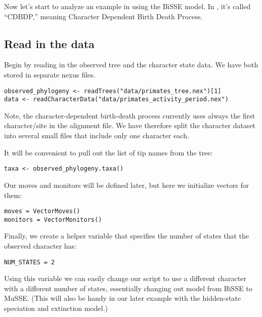 Now let's start to analyze an example in \RevBayes using the BiSSE model.
In \RevBayes, it's called ``CDBDP,'' meaning Character Dependent Birth Death Process.

\subsection{Read in the data}

Begin by reading in the observed tree and the character state data.
We have both stored in separate nexus files.
{\tt \begin{snugshade*}
\begin{lstlisting}
observed_phylogeny <- readTrees("data/primates_tree.nex")[1]
data <- readCharacterData("data/primates_activity_period.nex")
\end{lstlisting}
\end{snugshade*}}
Note, the character-dependent birth-death process currently uses always the first character/site in the alignment file.
We have therefore split the character dataset into several small files that include only one character each.

It will be convenient to pull out the list of tip names from the tree:
{\tt \begin{snugshade*}
\begin{lstlisting}
taxa <- observed_phylogeny.taxa()
\end{lstlisting}
\end{snugshade*}}

Our moves and monitors will be defined later, but here we initialize vectors for them:
{\tt \begin{snugshade*}
\begin{lstlisting}
moves = VectorMoves()
monitors = VectorMonitors()
\end{lstlisting}
\end{snugshade*}}

Finally, we create a helper variable that specifies the number of states that the observed character has:
{\tt \begin{snugshade*}
\begin{lstlisting}
NUM_STATES = 2
\end{lstlisting}
\end{snugshade*}}
Using this variable we can easily change our script to use a different character with a different number of states,
essentially changing out model from BiSSE to MuSSE.
(This will also be handy in our later example with the hidden-state speciation and extinction model.)

